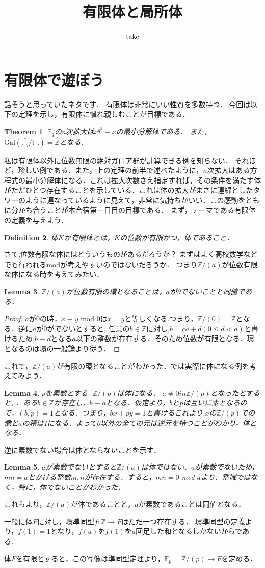 \documentclass{ujarticle}
\author{take}
\title{有限体と局所体}
\newtheorem{thm}{Theorem}[section]
\newtheorem{dfn}[thm]{Definition}
\newtheorem{lem}[thm]{Lemma}
\begin{document}
\maketitle
\tableofcontents





\section{有限体で遊ぼう}
\label{sub:有限体で遊ぼう}
話そうと思っていたネタです．
有限体は非常にいい性質を多数持つ．
今回は以下の定理を示し，有限体に慣れ親しむことが目標である．
\begin{thm}
 $\mathbb{F}_q$のn次拡大は$x^{q^n}-x$の最小分解体である．
 また，$\mathrm{Gal}(\bar{\mathbb{F}_q}/\mathbb{F}_q)=\hat{\mathbb{Z}}$となる．
\end{thm}
私は有限体以外に位数無限の絶対ガロア群が計算できる例を知らない．
それほど，珍しい例である．また，上の定理の前半で述べたように，$n$次拡大はある方程式の最小分解体になる．これは拡大次数さえ指定すれば，その条件を満たす体がただひとつ存在することを示している．これは体の拡大がまさに連綿としたタワーのように連なっているように見えて，非常に気持ちがいい．この感動をともに分かち合うことが本合宿第一日目の目標である．
まず，テーマである有限体の定義を与えよう．
\begin{dfn}
  体$K$が有限体とは，$K$の位数が有限かつ，体であること．
\end{dfn}

さて,位数有限な体にはどういうものがあるだろうか？
まずはよく高校数学などでも行われるmodが考えやすいのではないだろうか．
つまり$\mathbb{Z}/(a)$が位数有限な体になる時を考えてみたい．

\begin{lem}
 $ \mathbb{Z}/(a) $が位数有限の環となることは，$a$が0でないことと同値である．
\end{lem}
\begin{proof}
  $a$が0の時，$ x \equiv y$ mod 0は$x =y $と等しくなる.つまり，$\mathbb{Z}/(0) = \mathbb{Z}$となる．逆に$a$が0がでないとすると,
  任意の$b \in \mathbb{Z}$に対し,$b = ca +d(0 \leq d < a)$と書けるため,$b \equiv d$となる$a$以下の整数が存在する．そのため位数が有限となる．環となるのは環の一般論より従う．
\end{proof}
これで，$\mathbb{Z}/(a)$が有限の環となることがわかった．では実際に体になる例を考えてみよう．
\begin{lem}
$p$を素数とする. $\mathbb{Z}/(p)$は体になる．
$a \neq 0 in \mathbb{Z}/(p)$となったとすると,
．ある$b \in \mathbb{Z}$が存在し，$b \equiv a$となる．仮定より，$b $と$p$は互いに素となるので，$(b,p)=1$となる．つまり，$bx + py =1$と書けるこれより,$x$の$\mathbb{Z}/(p)$での像と$a$の積は1になる．よって0以外の全ての元は逆元を持つことがわかり，体となる．
\end{lem}
逆に素数でない場合は体とならないことを示す．
\begin{lem}
 $a$が素数でないとすると$\mathbb{Z}/(a)$は体ではない．$a$が素数でないため，$mn=a$とかける整数$m,n$が存在する．すると，$m \dot n= 0 $ mod $a$より．整域ではなく，特に，体でないことがわかった．
\end{lem}
これらより，$\mathbb{Z}/(a)$が体であることと，$a$が素数であることは同値となる．

一般に体$F$に対し，環準同型$f:\mathbb{Z} \to F$はただ一つ存在する．
環準同型の定義より，$f(1)=1$となり，$f(a)$を$f(1)$を$a$回足した和となるしかないからである．

体$F$を有限とすると，この写像は準同型定理より，$\mathbb{F}_p =\mathbb{Z}/(p) \to F$を定める．
\end{document}
